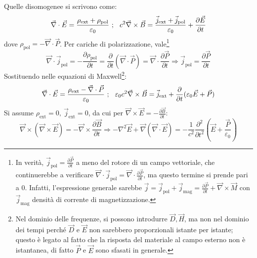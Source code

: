 \documentclass[a4paper]{scrartcl}
\numberwithin{equation}{subsection}
\theoremstyle{style1}
\begin{document}
Quelle disomogenee si scrivono come:
\begin{equation}
		 \vec{\nabla }\cdot \vec{E}= \frac{\rho _\text{ext}+ \rho _\text{pol}}{\varepsilon _0}\ ;\hspace{.25cm} c^2 \vec{\nabla }\times \vec{B}= \frac{\vec{j}_\text{ext}+ \vec{j}_\text{pol}}{\varepsilon _0} + \frac{\partial \vec{E}}{\partial t} 
\end{equation}
dove $\rho _\text{pol}=-\vec{\nabla }\cdot \vec{P}$. Per cariche di polarizzazione, vale\footnote{In verit\`a, $\vec{j}_\text{pol}=\frac{\partial \vec{P}}{\partial t} $ a meno del rotore di un campo vettoriale, che continuerebbe a verificare $\vec{\nabla }\cdot \vec{j}_\text{pol}= \vec{\nabla }\cdot \frac{\partial \vec{P}}{\partial t} $, ma questo termine si prende pari a $0$. Infatti, l'espressione generale sarebbe $\vec{j}= \vec{j}_\text{pol}+\vec{j}_\text{mag}=\frac{\partial \vec{P}}{\partial t} +\vec{\nabla }\times \vec{M}$ con $\vec{j}_\text{mag}$ densit\`a di corrente di magnetizzazione.}
\begin{equation}
		\vec{\nabla }\cdot \vec{j}_\text{pol}= - \frac{\partial \rho _\text{pol}}{\partial t}= \frac{\partial }{\partial t} (\vec{\nabla }\cdot \vec{P}) = \vec{\nabla }\cdot \frac{\partial \vec{P}}{\partial t} \Rightarrow \vec{j}_\text{pol}= \frac{\partial \vec{P}}{\partial t} 
\end{equation}
Sostituendo nelle equazioni di Maxwell\footnote{Nel dominio delle frequenze, si possono introdurre $\vec{D}, \vec{H}$, ma non nel dominio dei tempi perch\'e $\vec{D}$ e $\vec{E}$ non sarebbero proporzionali istante per istante; questo \`e legato al fatto che la risposta del materiale al campo esterno non \`e istantanea, di fatto $\vec{P}$ e $\vec{E}$ sono sfasati in generale.}:
\begin{equation}
	\vec{\nabla }\cdot \vec{E}=\frac{\rho _\text{ext}-\vec{\nabla }\cdot \vec{P}}{\varepsilon _0}\ ;\hspace{.25cm} \varepsilon _0 c^2 \vec{\nabla }\times  \vec{B}= \vec{j}_\text{ext}+ \frac{\partial }{\partial t} (\varepsilon _0 \vec{E}+\vec{P})
\end{equation}
Si assume $\rho _\text{ext}=0, \ \vec{j}_\text{ext}=0$, da cui per $\vec{\nabla }\times \vec{E}= - \frac{\partial \vec{B}}{\partial t} $:
\begin{equation}
	\vec{\nabla }\times (\vec{\nabla }\times \vec{E}) = - \vec{\nabla }\times \frac{\partial \vec{B}}{\partial t} \Rightarrow -\nabla ^2 \vec{E}+\vec{\nabla }(\vec{\nabla }\cdot \vec{E}) = - \frac{1}{c^2} \frac{\partial^2 }{\partial t^2} \left(\vec{E}+\frac{\vec{P}}{\varepsilon _0}\right) 
\end{equation}
\end{document}
